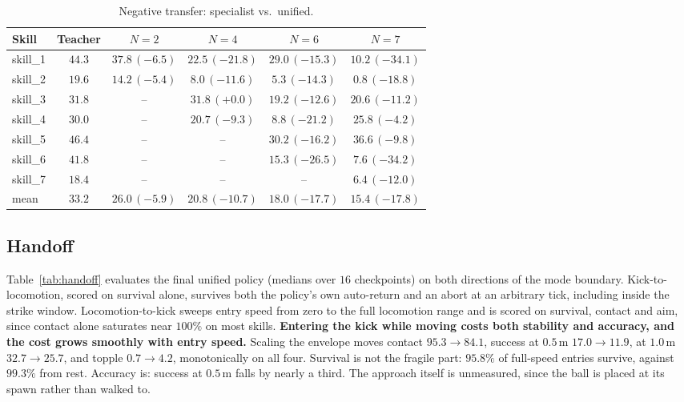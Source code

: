 \documentclass[letterpaper, 10 pt, conference]{ieeeconf}  %
\begin{document}
\begin{table}[htbp]
\centering
\caption{Negative transfer: specialist vs.\ unified.}
\label{tab:negtransfer}
\scriptsize
\setlength{\tabcolsep}{2.5pt}
\begin{tabular}{@{}lccccc@{}}
\toprule
Skill & Teacher & $N{=}2$ & $N{=}4$ & $N{=}6$ & $N{=}7$ \\
\midrule
skill\_1 & $44.3$ & $37.8\,(-6.5)$ & $22.5\,(-21.8)$ & $29.0\,(-15.3)$ & $10.2\,(-34.1)$ \\
skill\_2 & $19.6$ & $14.2\,(-5.4)$ & $8.0\,(-11.6)$  & $5.3\,(-14.3)$  & $0.8\,(-18.8)$ \\
skill\_3 & $31.8$ & --             & $31.8\,(+0.0)$  & $19.2\,(-12.6)$ & $20.6\,(-11.2)$ \\
skill\_4 & $30.0$ & --             & $20.7\,(-9.3)$  & $8.8\,(-21.2)$  & $25.8\,(-4.2)$ \\
skill\_5 & $46.4$ & --             & --              & $30.2\,(-16.2)$ & $36.6\,(-9.8)$ \\
skill\_6 & $41.8$ & --             & --              & $15.3\,(-26.5)$ & $7.6\,(-34.2)$ \\
skill\_7 & $18.4$ & --             & --              & --              & $6.4\,(-12.0)$ \\
\midrule
mean     & $33.2$ & $26.0\,(-5.9)$ & $20.8\,(-10.7)$ & $18.0\,(-17.7)$ & $15.4\,(-17.8)$ \\
\bottomrule
\end{tabular}

\end{table}

\subsection{Handoff}
\label{sec:handoff-results}

Table~\ref{tab:handoff} evaluates the final unified policy (medians over
$16$ checkpoints) on both directions of the mode boundary.
Kick-to-locomotion, scored on survival alone, survives both the policy's
own auto-return and an abort at an arbitrary tick, including inside the
strike window. Locomotion-to-kick sweeps entry speed from zero to the full
locomotion range and is scored on survival, contact and aim, since contact
alone saturates near $100\%$ on most skills. \textbf{Entering the kick
while moving costs both stability and accuracy, and the cost grows smoothly
with entry speed.} Scaling the envelope moves contact $95.3{\to}84.1$,
success at $0.5$\,m $17.0{\to}11.9$, at $1.0$\,m $32.7{\to}25.7$, and topple
$0.7{\to}4.2$, monotonically on all four. Survival is not the fragile part: $95.8\%$ of full-speed entries survive,
against $99.3\%$ from rest. Accuracy is: success at $0.5$\,m
falls by nearly a third. The approach itself is unmeasured, since the ball is placed at its spawn rather than walked to.
\end{document}
